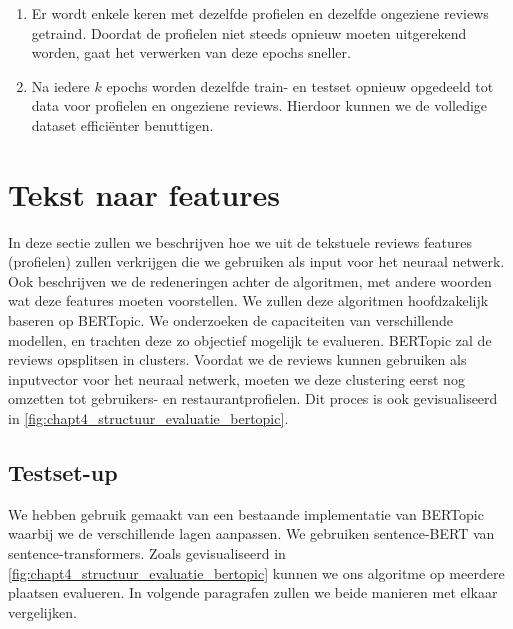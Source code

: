 \begin{enumerate}
    \item Er wordt enkele keren met dezelfde profielen en dezelfde ongeziene reviews getraind. Doordat de profielen niet steeds opnieuw moeten uitgerekend worden, gaat het verwerken van deze epochs sneller.

    \item Na iedere $k$ epochs worden dezelfde train- en testset opnieuw opgedeeld tot data voor profielen en ongeziene reviews. Hierdoor kunnen we de volledige dataset efficiënter benuttigen.
\end{enumerate}



\section{Tekst naar features}
\label{sec:chapt4_tekst_naar_features}
In deze sectie zullen we beschrijven hoe we uit de tekstuele reviews features (profielen) zullen verkrijgen die we gebruiken als input voor het neuraal netwerk. Ook beschrijven we de redeneringen achter de algoritmen, met andere woorden wat deze features moeten voorstellen. We zullen deze algoritmen hoofdzakelijk baseren op BERTopic. We onderzoeken de capaciteiten van verschillende modellen, en trachten deze zo objectief mogelijk te evalueren. BERTopic zal de reviews opsplitsen in clusters. Voordat we de reviews kunnen gebruiken als inputvector voor het neuraal netwerk, moeten we deze clustering eerst nog omzetten tot gebruikers- en restaurantprofielen. Dit proces is ook gevisualiseerd in \autoref{fig:chapt4_structuur_evaluatie_bertopic}.


\subsection{Testset-up}
\label{sub:chapt4_testsetup}
We hebben gebruik gemaakt van een bestaande implementatie van BERTopic \cite{bertopic_homepage} waarbij we de verschillende lagen aanpassen. We gebruiken sentence-BERT van sentence-transformers. \cite{sentence_transformers_implementation} Zoals gevisualiseerd in \autoref{fig:chapt4_structuur_evaluatie_bertopic} kunnen we ons algoritme op meerdere plaatsen evalueren. In volgende paragrafen zullen we beide manieren met elkaar vergelijken.

